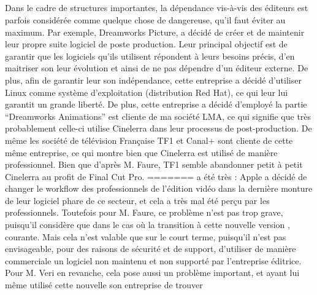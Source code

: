 \begin{itemize}
\subparagraph{}

Dans le cadre de structures importantes, la dépendance vis-à-vis des
éditeurs est parfois considérée comme quelque chose de dangereuse,
qu'il faut éviter au maximum. Par exemple, Dreamworks Picture, a décidé
de créer et de maintenir leur propre suite logiciel \cite {Dreamworks}
de poste production. Leur principal objectif  est de garantir que
les logiciels qu'ils utilisent répondent à leurs besoins précis,
d'en maitriser son leur évolution et ainsi de ne pas dépendre d'un
éditeur externe. De plus, afin de garantir leur son indépendance, cette
entreprise a décidé d'utiliser Linux comme système d'exploitation
(distribution Red Hat), ce qui leur lui garantit un grande liberté. De
plus, cette entreprise a décidé d'employé la partie ``Dreamworks
Animations'' est cliente de ma société LMA, ce qui signifie que
très probablement celle-ci utilise Cinelerra dans leur processus de
post-production. De même les société de télévision Française TF1
et Canal+ sont cliente de cette même entreprise, ce qui montre bien
que Cinelerra est utilisé de manière professionnel. Bien que d'après
M. Faure, TF1 semble abandonner petit à petit Cinelerra au profit de
Final Cut Pro.
=======
a été très %
: Apple a décidé de changer le workflow  des
professionnels de l'édition vidéo dans la dernière monture de leur
logiciel phare de ce secteur, et cela a très mal été perçu par
les professionnels. Toutefois pour M. Faure, ce problème n'est pas
trop grave, puisqu'il considère que dans le cas où la transition
à cette nouvelle version %
, %
courante.  Mais cela n'est valable que sur le court terme, puisqu'il
n'est pas envisageable, pour des raisons de sécurité et de support,
d'utiliser de manière commerciale un logiciel non maintenu et non
supporté par l'entreprise éditrice. Pour M. Veri en revanche, cela
pose aussi un problème important, et ayant lui même utilisé cette
nouvelle %
son entreprise de trouver %

\subparagraph{}


\end{itemize}
